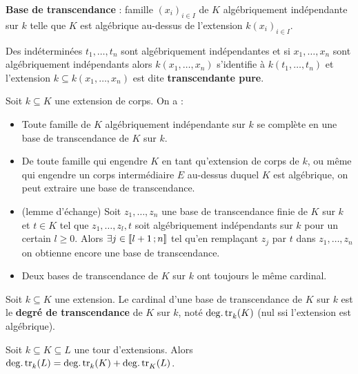 	\begin{defn}
		\textbf{Base de transcendance} : famille $(x_i)_{i \in I}$ de $K$ algébriquement indépendante sur $k$ telle que $K$ est algébrique au-dessus de l'extension $k(x_i)_{i \in I}$.
	\end{defn}
	
	\begin{rem}
		Des indéterminées $t_1,\ldots,t_n$ sont algébriquement indépendantes et si $x_1,\ldots,x_n$ sont algébriquement indépendants alors $k(x_1,\ldots,x_n)$ s'identifie à $k(t_1,\ldots,t_n)$ et l'extension $k \subseteq k(x_1,\ldots,x_n)$ est dite \textbf{transcendante pure}.
	\end{rem}
	
	\begin{pop}
		Soit $k \subseteq K$ une extension de corps. On a :
		\begin{itemize}
			\item[\textbullet] Toute famille de $K$ algébriquement indépendante sur $k$ se complète en une base de transcendance de $K$ sur $k$.
			\item[\textbullet] De toute famille qui engendre $K$ en tant qu'extension de corps de $k$, ou même qui engendre un corps intermédiaire $E$ au-dessus duquel $K$ est algébrique, on peut extraire une base de transcendance.
			\item[\textbullet] (lemme d'échange) Soit $z_1,\ldots,z_n$ une base de transcendance finie de $K$ sur $k$ et $t \in K$ tel que $z_1,\ldots,z_l,t$ soit algébriquement indépendants sur $k$ pour un certain $l \geq 0$.
				Alors $\exists j \in \mathopen{[\![}l + 1\mathclose{}\mathpunct{};n\mathclose{]\!]}$ tel qu'en remplaçant $z_j$ par $t$ dans $z_1,\ldots,z_n$ on obtienne encore une base de transcendance.
			\item[\textbullet] Deux bases de transcendance de $K$ sur $k$ ont toujours le même cardinal.
		\end{itemize}
	\end{pop}
	
	\begin{defn}
		Soit $k \subseteq K$ une extension.
		Le cardinal d'une base de transcendance de $K$ sur $k$ est le \textbf{degré de transcendance} de $K$ sur $k$, noté $\operatorname{deg. tr}_k(K)$ (nul ssi l'extension est algébrique).
	\end{defn}
	
	\begin{pop}
		Soit $k \subseteq  K \subseteq L$ une tour d'extensions.
		Alors $\operatorname{deg. tr}_k(L) = \operatorname{deg. tr}_k(K) + \operatorname{deg. tr}_K(L)$.
	\end{pop}
	
